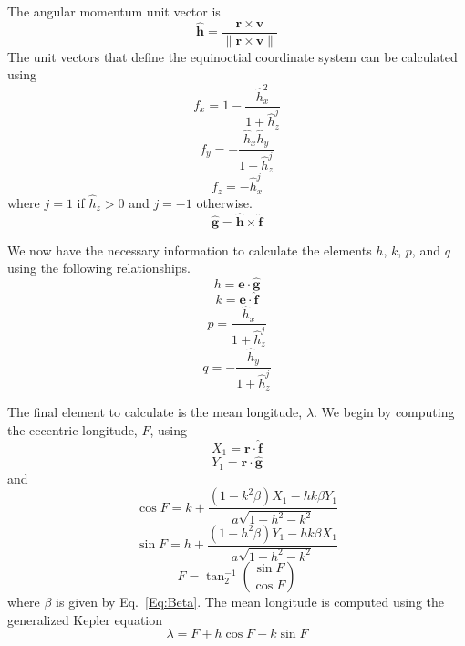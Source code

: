 The angular momentum unit vector is
%
\begin{equation}
   \hat{\mathbf{h}} = \frac{\mathbf{r} \times \mathbf{v} }{ \| \mathbf{r} \times \mathbf{v} \|}
\end{equation}
%
The unit vectors that define the equinoctial coordinate system can
be calculated using
%
\begin{equation}
   f_x = 1 - \frac{\hat{h}_x^2}{ 1 + \hat{h}_z^j}
\end{equation}
%
\begin{equation}
   f_y = -\frac{\hat{h}_x \hat{h}_y}{ 1 + \hat{h}_z^j}
\end{equation}
%
\begin{equation}
   f_z = -\hat{h}_x^j
\end{equation}
%
where $j = 1$ if $ \hat{h}_z > 0 $  and $j = -1$ otherwise. \\
%
\begin{equation}
    \hat{\mathbf{g}} = \hat{\mathbf{h}} \times \hat{\mathbf{f}}
\end{equation}
%

We now have the necessary information to calculate the elements
$h$, $k$, $p$, and $q$ using the following relationships.
%
\begin{equation}
    h = \mathbf{e} \cdot \hat{\mathbf{g}}
\end{equation}
%
\begin{equation}
    k = \mathbf{e} \cdot \hat{\mathbf{f}}
\end{equation}
%
\begin{equation}
    p = \frac{\hat{h}_x}{1+\hat{h}_z^j}
\end{equation}
%
\begin{equation}
    q = - \frac{\hat{h}_y}{1+\hat{h}_z^j}
\end{equation}
%

The final element to calculate is the mean longitude, $\lambda$.
We begin by computing the eccentric longitude, $F$,  using
%
\begin{equation}
    X_1 = \mathbf{r} \cdot \hat{\mathbf{f}}
\end{equation}
%
\begin{equation}
    Y_1 = \mathbf{r} \cdot \hat{\mathbf{g}}
\end{equation}
%
and
%
\begin{equation}
     \cos{F} = k + \frac{ \left( 1 - k^2 \beta \right) X_1 - h k \beta Y_1}{a\sqrt{1 - h^2 - k^2}}
\end{equation}
%
\begin{equation}
     \sin{F} = h + \frac{ \left( 1 - h^2 \beta \right) Y_1 - h k \beta X_1}{a\sqrt{1 - h^2 - k^2}}
\end{equation}
%
\begin{equation}
     F = \tan^{-1}_2\left( \frac{\sin{F}}{\cos{F}}\right)
\end{equation}
%
where $\beta$ is given by Eq.~\ref{Eq:Beta}.  The mean longitude
is computed using the generalized Kepler equation
%
\begin{equation}
    \lambda = F + h \cos{F} - k \sin{F}
\end{equation}


